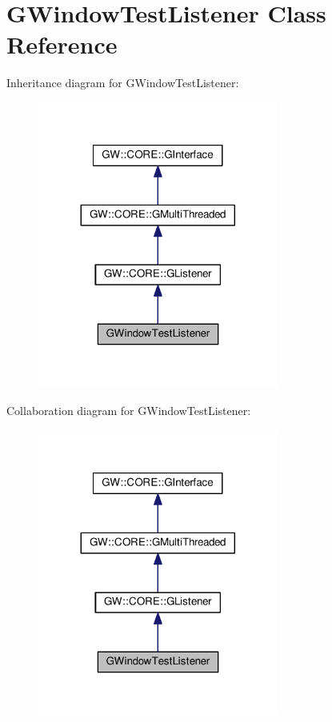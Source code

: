\hypertarget{classGWindowTestListener}{}\section{G\+Window\+Test\+Listener Class Reference}
\label{classGWindowTestListener}


Inheritance diagram for G\+Window\+Test\+Listener\+:
\nopagebreak
\begin{figure}[H]
\begin{center}
\leavevmode
\includegraphics[width=224pt]{classGWindowTestListener__inherit__graph}
\end{center}
\end{figure}


Collaboration diagram for G\+Window\+Test\+Listener\+:
\nopagebreak
\begin{figure}[H]
\begin{center}
\leavevmode
\includegraphics[width=224pt]{classGWindowTestListener__coll__graph}
\end{center}
\end{figure}
